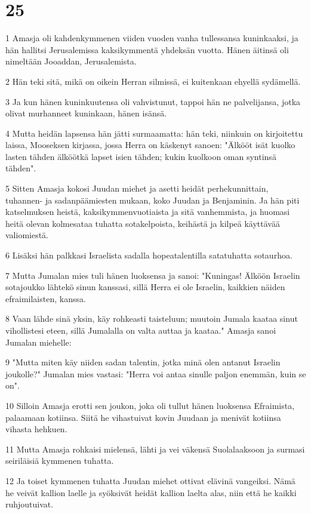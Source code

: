 \chapter{25}

\par 1 Amasja oli kahdenkymmenen viiden vuoden vanha tullessansa kuninkaaksi, ja hän hallitsi Jerusalemissa kaksikymmentä yhdeksän vuotta. Hänen äitinsä oli nimeltään Jooaddan, Jerusalemista.
\par 2 Hän teki sitä, mikä on oikein Herran silmissä, ei kuitenkaan ehyellä sydämellä.
\par 3 Ja kun hänen kuninkuutensa oli vahvistunut, tappoi hän ne palvelijansa, jotka olivat murhanneet kuninkaan, hänen isänsä.
\par 4 Mutta heidän lapsensa hän jätti surmaamatta: hän teki, niinkuin on kirjoitettu laissa, Mooseksen kirjassa, jossa Herra on käskenyt sanoen: "Älkööt isät kuolko lasten tähden älköötkä lapset isien tähden; kukin kuolkoon oman syntinsä tähden".
\par 5 Sitten Amasja kokosi Juudan miehet ja asetti heidät perhekunnittain, tuhannen- ja sadanpäämiesten mukaan, koko Juudan ja Benjaminin. Ja hän piti katselmuksen heistä, kaksikymmenvuotiaista ja sitä vanhemmista, ja huomasi heitä olevan kolmesataa tuhatta sotakelpoista, keihästä ja kilpeä käyttävää valiomiestä.
\par 6 Lisäksi hän palkkasi Israelista sadalla hopeatalentilla satatuhatta sotaurhoa.
\par 7 Mutta Jumalan mies tuli hänen luoksensa ja sanoi: "Kuningas! Älköön Israelin sotajoukko lähtekö sinun kanssasi, sillä Herra ei ole Israelin, kaikkien näiden efraimilaisten, kanssa.
\par 8 Vaan lähde sinä yksin, käy rohkeasti taisteluun; muutoin Jumala kaataa sinut vihollistesi eteen, sillä Jumalalla on valta auttaa ja kaataa." Amasja sanoi Jumalan miehelle:
\par 9 "Mutta miten käy niiden sadan talentin, jotka minä olen antanut Israelin joukolle?" Jumalan mies vastasi: "Herra voi antaa sinulle paljon enemmän, kuin se on".
\par 10 Silloin Amasja erotti sen joukon, joka oli tullut hänen luoksensa Efraimista, palaamaan kotiinsa. Siitä he vihastuivat kovin Juudaan ja menivät kotiinsa vihasta hehkuen.
\par 11 Mutta Amasja rohkaisi mielensä, lähti ja vei väkensä Suolalaaksoon ja surmasi seiriläisiä kymmenen tuhatta.
\par 12 Ja toiset kymmenen tuhatta Juudan miehet ottivat elävinä vangeiksi. Nämä he veivät kallion laelle ja syöksivät heidät kallion laelta alas, niin että he kaikki ruhjoutuivat.
